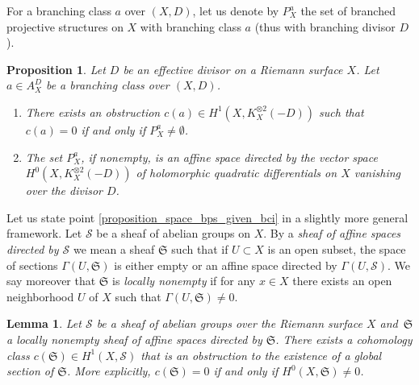 \documentclass[10pt]{amsart}
\theoremstyle{definition}
\theoremstyle{plain}
\newtheorem{proposition}[definition]{Proposition}
\newtheorem{lemma}[definition]{Lemma}
\begin{document}
For a branching class $a$ over $(X, D)$, let us denote by $P^a_X$ the set of branched projective structures on $X$ with branching class $a$ (thus with branching divisor $D$).

\begin{proposition}\label{proposition_space_bps_given_bc}
Let $D$ be an effective divisor on a Riemann surface $X$. Let $a \in A_X^D$ be a branching class over $(X, D)$.
\begin{enumerate}
\item\label{proposition_space_bps_given_bci}
There exists an obstruction $c(a) \in H^1\left(X, K_X^{\otimes 2}(-D)\right)$ such that $c(a)=0$ if and only if $P_X^a \neq \emptyset$.
\item\label{proposition_space_bps_given_bcii}
The set $P_X^a$, if nonempty, is an affine space directed by the vector space $H^0\left(X, K_X^{\otimes 2}(-D)\right)$ of holomorphic quadratic differentials on $X$ vanishing over the divisor $D$.
\end{enumerate}
\end{proposition}

Let us state point \eqref{proposition_space_bps_given_bci} in a slightly more general framework.
Let $\mathcal S$ be a sheaf of abelian groups on $X$.
By a \emph{sheaf of affine spaces directed by $\mathcal S$} we mean a sheaf $\mathfrak S$ such that if $U \subset X$ is an open subset, the space of sections $\Gamma(U, \mathfrak S)$ is either empty or an affine space directed by $\Gamma(U, \mathcal S)$.
We say moreover that $\mathfrak S$ is \emph{locally nonempty} if for any $x \in X$ there exists an open neighborhood $U$ of $X$ such that $\Gamma(U, \mathfrak S) \neq 0$.

\begin{lemma}\label{lemma_obstruction_affine_sheaf}
Let $\mathcal S$ be a sheaf of abelian groups over the Riemann surface $X$ and~$\mathfrak S$ a locally nonempty sheaf of affine spaces directed by $\mathfrak S$.
There exists a cohomology class $c(\mathfrak S) \in H^1(X, \mathcal S)$ that is an obstruction to the existence of a global section of $\mathfrak S$. More explicitly, $c(\mathfrak S)=0$ if and only if $H^0(X, \mathfrak S) \neq 0$.
\end{lemma}
\end{document}
